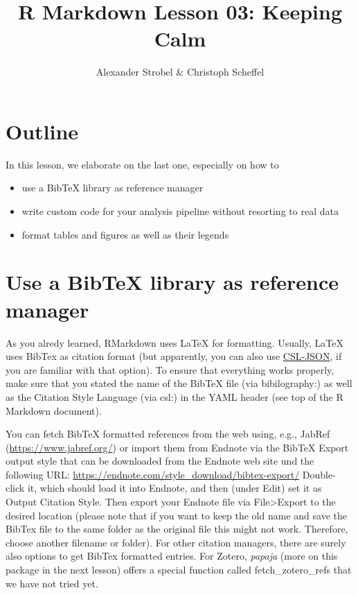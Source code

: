 \documentclass[
]{article}
\title{R Markdown Lesson 03: Keeping Calm}
\author{Alexander Strobel \& Christoph Scheffel}
\date{}
\providecommand{\tightlist}{%
  \setlength{\itemsep}{0pt}\setlength{\parskip}{0pt}}
\begin{document}
\maketitle

\hypertarget{outline}{%
\section{Outline}\label{outline}}

In this lesson, we elaborate on the last one, especially on how to

\begin{itemize}
\tightlist
\item
  use a BibTeX library as reference manager
\item
  write custom code for your analysis pipeline without resorting to real
  data
\item
  format tables and figures as well as their legends
\end{itemize}

\hypertarget{use-a-bibtex-library-as-reference-manager}{%
\section{Use a BibTeX library as reference
manager}\label{use-a-bibtex-library-as-reference-manager}}

As you alredy learned, RMarkdown uses LaTeX for formatting. Usually,
LaTeX uses BibTex as citation format (but apparently, you can also use
\href{https://citeproc-js.readthedocs.io/en/latest/csl-json/markup.html}{CSL-JSON},
if you are familiar with that option). To ensure that everything works
properly, make sure that you stated the name of the BibTeX file (via
bibilography:) as well as the Citation Style Language (via csl:) in the
YAML header (see top of the R Markdown document).

You can fetch BibTeX formatted references from the web using, e.g.,
JabRef (\url{https://www.jabref.org/}) or import them from Endnote via
the BibTeX Export output style that can be downloaded from the Endnote
web site und the following URL:
\url{https://endnote.com/style_download/bibtex-export/} Double-click it,
which should load it into Endnote, and then (under Edit) set it as
Output Citation Style. Then export your Endnote file via
File\textgreater Export to the desired location (please note that if you
want to keep the old name and save the BibTex file to the same folder as
the original file this might not work. Therefore, choose another
filename or folder). For other citation managers, there are surely also
options to get BibTex formatted entries. For Zotero, \emph{papaja} (more
on this package in the next lesson) offers a special function called
fetch\_zotero\_refs that we have not tried yet.
\end{document}
